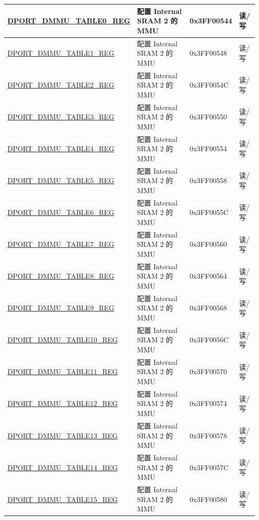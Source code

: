\begin{longtable}{|L{8.2cm}|L{4.5cm}| l | l | }
\hyperref[regdesc:DMMUTABLEnREG]{DPORT\_DMMU\_TABLE0\_REG} & 配置 Internal SRAM 2 的 MMU& 0x3FF00544 & 读/写 \\ \hline
\hyperref[regdesc:DMMUTABLEnREG]{DPORT\_DMMU\_TABLE1\_REG} & 配置 Internal SRAM 2 的 MMU& 0x3FF00548 & 读/写 \\ \hline
\hyperref[regdesc:DMMUTABLEnREG]{DPORT\_DMMU\_TABLE2\_REG} & 配置 Internal SRAM 2 的 MMU& 0x3FF0054C & 读/写 \\ \hline
\hyperref[regdesc:DMMUTABLEnREG]{DPORT\_DMMU\_TABLE3\_REG} & 配置 Internal SRAM 2 的 MMU& 0x3FF00550 & 读/写 \\ \hline
\hyperref[regdesc:DMMUTABLEnREG]{DPORT\_DMMU\_TABLE4\_REG} & 配置 Internal SRAM 2 的 MMU& 0x3FF00554 & 读/写 \\ \hline
\hyperref[regdesc:DMMUTABLEnREG]{DPORT\_DMMU\_TABLE5\_REG} & 配置 Internal SRAM 2 的 MMU& 0x3FF00558 & 读/写 \\ \hline
\hyperref[regdesc:DMMUTABLEnREG]{DPORT\_DMMU\_TABLE6\_REG} & 配置 Internal SRAM 2 的 MMU& 0x3FF0055C & 读/写 \\ \hline
\hyperref[regdesc:DMMUTABLEnREG]{DPORT\_DMMU\_TABLE7\_REG} & 配置 Internal SRAM 2 的 MMU& 0x3FF00560 & 读/写 \\ \hline
\hyperref[regdesc:DMMUTABLEnREG]{DPORT\_DMMU\_TABLE8\_REG} & 配置 Internal SRAM 2 的 MMU& 0x3FF00564 & 读/写 \\ \hline
\hyperref[regdesc:DMMUTABLEnREG]{DPORT\_DMMU\_TABLE9\_REG} & 配置 Internal SRAM 2 的 MMU& 0x3FF00568 & 读/写 \\ \hline
\hyperref[regdesc:DMMUTABLEnREG]{DPORT\_DMMU\_TABLE10\_REG} & 配置 Internal SRAM 2 的 MMU& 0x3FF0056C & 读/写 \\ \hline
\hyperref[regdesc:DMMUTABLEnREG]{DPORT\_DMMU\_TABLE11\_REG} & 配置 Internal SRAM 2 的 MMU& 0x3FF00570 & 读/写 \\ \hline
\hyperref[regdesc:DMMUTABLEnREG]{DPORT\_DMMU\_TABLE12\_REG} & 配置 Internal SRAM 2 的 MMU& 0x3FF00574 & 读/写 \\ \hline
\hyperref[regdesc:DMMUTABLEnREG]{DPORT\_DMMU\_TABLE13\_REG} & 配置 Internal SRAM 2 的 MMU& 0x3FF00578 & 读/写 \\ \hline
\hyperref[regdesc:DMMUTABLEnREG]{DPORT\_DMMU\_TABLE14\_REG} & 配置 Internal SRAM 2 的 MMU& 0x3FF0057C & 读/写 \\ \hline
\hyperref[regdesc:DMMUTABLEnREG]{DPORT\_DMMU\_TABLE15\_REG} & 配置 Internal SRAM 2 的 MMU& 0x3FF00580 & 读/写 \\ \hline


\end{longtable}
